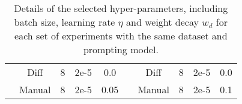 \begin{table*}[!ht]
{\begin{tabular}{c | c | c c c | c | c | c c c}
        & Diff
        &  8
        & 2e-5
        & 0.0
        &
        & Diff
        &  8
        & 2e-5
        & 0.0 \\

        & Manual
        &  8
        & 2e-5
        & 0.05

        &
        & Manual
        &  8
        & 2e-5
        & 0.1 \\

        \toprule
        \end{tabular}
 }
 \caption{Details of the selected hyper-parameters, including batch size, learning rate $\eta$ and weight decay $w_d$ for each set of experiments with the same dataset and prompting model.}
 \label{tab:hyper_param}
\end{table*}
